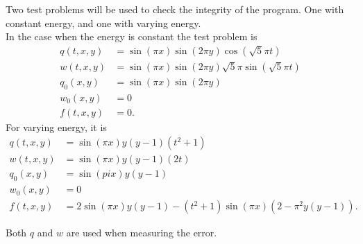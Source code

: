 Two test problems will be used to check the integrity of the program. One with constant energy, and one with varying energy. \\

In the case when the energy is constant the test problem is 
\begin{equation}
\begin{aligned}
q(t,x,y) &= \sin(\pi x) \sin( 2 \pi y) \cos(\sqrt{5} \pi t) \\
w (t,x,y) &= \sin(\pi x) \sin( 2 \pi y) \sqrt{5} \pi \sin(\sqrt{5} \pi t) \\
q_0(x,y) &= \sin( \pi x) \sin(2 \pi y) \\
w_0(x,y) & = 0 \\
f(t,x,y) &= 0 .
\end{aligned}
\end{equation}
For varying energy, it is
\begin{equation}
\begin{aligned}
q(t,x,y) &= \sin(\pi x) y (y-1) (t^2+1) \\
w(t,x,y) &= \sin(\pi x) y (y-1) (2 t) \\
q_0(x,y) &= \sin(pi x) y (y-1) \\
w_0(x,y) & = 0 \\
f(t,x,y) & = 2  \sin(\pi x) y (y-1) -(t^2+1) \sin(\pi x) (2-\pi^2 y (y-1)).
\end{aligned}
\end{equation}



Both $q$ and $w$ are used when measuring the error. \\

